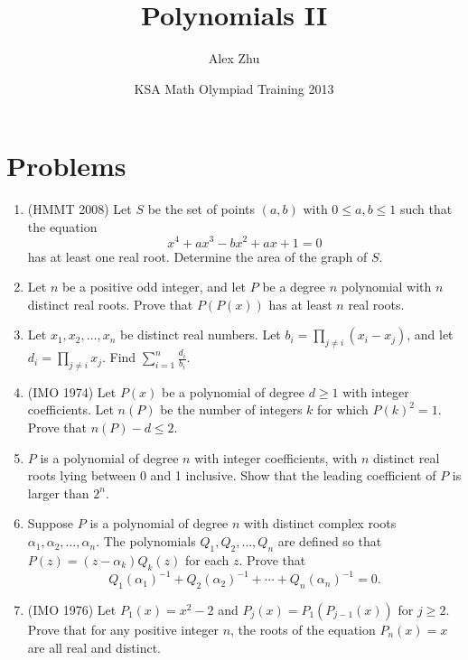 \documentclass[11pt]{article}
\begin{document}
 

\title{Polynomials II}
\author{Alex Zhu}
\date{KSA Math Olympiad Training 2013}

\maketitle

\section{Problems}
  
\begin{enumerate} 
  \item (HMMT 2008) Let $S$ be the set of points $(a,b)$ with $0 \leq a,b \leq 1$ such that the equation \[ x^4 + ax^3 - bx^2 + ax + 1 = 0 \] has at least one real root. Determine the area of the graph of $S$. 
  
  \item Let $n$ be a positive odd integer, and let $P$ be a degree $n$ polynomial with $n$ distinct real roots. Prove that $P(P(x))$ has at least $n$ real roots. 
  
  \item Let $x_1, x_2, \ldots, x_n$ be distinct real numbers. Let $b_i = \prod_{j \neq i} (x_i - x_j)$, and let $d_i = \prod_{j \neq i} x_j$. Find $\sum_{i=1}^n \frac{d_i}{b_i}.$
  
  \item (IMO 1974) Let $P(x)$ be a polynomial of degree $d \geq 1$ with integer coefficients. Let $n(P)$ be the number of integers $k$ for which $P(k)^2 = 1$. Prove that $n(P) - d \leq 2$. 

  \item $P$ is a polynomial of degree $n$ with integer coefficients, with $n$ distinct real roots lying between 0 and 1 inclusive. Show that the leading coefficient of $P$ is larger than $2^n$. 
  
  \item Suppose $P$ is a polynomial of degree $n$ with distinct complex roots $\alpha_1, \alpha_2, \ldots, \alpha_n$. The polynomials $Q_1, Q_2, \ldots, Q_n$ are defined so that $P(z) = (z - \alpha_k) Q_k(z)$ for each $z$. Prove that
  \[ Q_1(\alpha_1)^{-1} + Q_2(\alpha_2)^{-1} + \cdots + Q_n(\alpha_n)^{-1} = 0. \]
        
  \item (IMO 1976) Let $P_1(x) = x^2 - 2$ and $P_j(x) = P_1(P_{j-1}(x))$ for $j \geq 2$. Prove that for any positive integer $n$, the roots of the equation $P_n(x) = x$ are all real and distinct. 


\end{enumerate}
\end{document}
